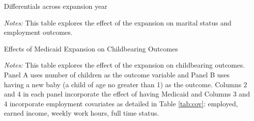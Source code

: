 \documentclass{article}
\begin{document}
\newpage
\begin{table}[h!]
\begin{centering}
\singlespacing
\caption{Differentials across expansion year}
\label{tab:expdiff}
\end{centering}
\begin{spacing}{1}
\begin{footnotesize}

\textit{Notes:} This table explores the effect of the expansion on marital status and employment outcomes.
\end{footnotesize}
\end{spacing}
\end{table}


\newpage
\begin{table}[h!]
\begin{centering}
\singlespacing
\caption{Effects of Medicaid Expansion on Childbearing Outcomes}
\label{tab:child_did}
\end{centering}
\begin{spacing}{1}
\begin{footnotesize}

\textit{Notes:} This table explores the effect of the expansion on childbearing outcomes. Panel A uses number of children as the outcome variable and Panel B uses having a new baby (a child of age no greater than 1) as the outcome. Columns 2 and 4 in each panel incorporate the effect of having Medicaid and Columns 3 and 4 incorporate employment covariates as detailed in Table \ref{tab:cov}: employed, earned income, weekly work hours, full time status.
\end{footnotesize}
\end{spacing}
\end{table}
\end{document}
